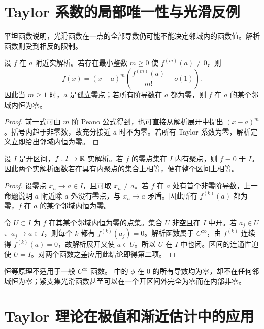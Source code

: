 \section{Taylor 系数的局部唯一性与光滑反例}

平坦函数说明，光滑函数在一点的全部导数仍可能不能决定邻域内的函数值。解析函数则受到相反的限制。

\begin{proposition}[零点的阶]
设 \(f\) 在 \(a\) 附近实解析。若存在最小整数 \(m\ge0\) 使 \(f^{(m)}(a)\ne0\)，则
\[
 f(x)=(x-a)^m\left(\frac{f^{(m)}(a)}{m!}+o(1)\right).
\]
因此当 \(m\ge1\) 时，\(a\) 是孤立零点；若所有阶导数在 \(a\) 都为零，则 \(f\) 在 \(a\) 的某个邻域内恒为零。
\end{proposition}

\begin{proof}
前一式可由 \(m\) 阶 Peano 公式得到，也可直接从解析展开中提出 \((x-a)^m\)。括号内趋于非零数，故充分接近 \(a\) 时不为零。若所有 Taylor 系数为零，解析定义立即给出邻域内恒为零。
\end{proof}

\begin{theorem}[实解析函数的恒等原理]
设 \(I\) 是开区间，\(f:I\to\mathbb{R}\) 实解析。若 \(f\) 的零点集在 \(I\) 内有聚点，则 \(f\equiv0\) 于 \(I\)。因此两个实解析函数若在具有内聚点的集合上相等，便在整个区间上相等。
\end{theorem}

\begin{proof}
设零点 \(x_n\to a\in I\)，且可取 \(x_n\ne a\)。若 \(f\) 在 \(a\) 处有首个非零阶导数，上一命题说明 \(a\) 附近除 \(a\) 外没有零点，与 \(x_n\to a\) 矛盾。因此所有 \(f^{(k)}(a)\) 都为零，\(f\) 在 \(a\) 的某个邻域内恒为零。

令 \(U\subset I\) 为 \(f\) 在其某个邻域内恒为零的点集。集合 \(U\) 非空且在 \(I\) 中开。若 \(a_j\in U\)、\(a_j\to a\in I\)，则每个 \(k\) 都有 \(f^{(k)}(a_j)=0\)。解析函数属于 \(C^\infty\)，由 \(f^{(k)}\) 连续得 \(f^{(k)}(a)=0\)，故解析展开又使 \(a\in U\)。所以 \(U\) 在 \(I\) 中也闭。区间的连通性迫使 \(U=I\)。对两个函数之差应用此结论即得第二项。
\end{proof}

恒等原理不适用于一般 \(C^\infty\) 函数。 中的 \(\phi\) 在 \(0\) 的所有导数均为零，却不在任何邻域恒为零；紧支集光滑函数甚至可以在一个开区间外完全为零而在内部非零。

\section{Taylor 理论在极值和渐近估计中的应用}

